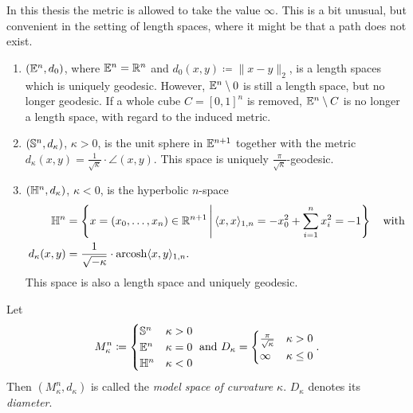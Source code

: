 \begin{rem}
  In this thesis the metric is allowed to take the value \(\infty\). This is a bit unusual, but convenient in the setting of length spaces, where it might be that a path does not exist.
\end{rem}

\begin{bsp}
  \begin{enumerate}
  \item \((\mathbb{E}^n, d_0)\), where \(\mathbb{E}^n = \mathbb{R}^n\) and \(d_0(x,y) \coloneqq \|x - y\|_2\), is a length spaces which is uniquely geodesic. However, \(\mathbb{E}^n \setminus {0}\) is still a length space, but no longer geodesic. If a whole cube \(C= [0,1]^n\) is removed, \(\mathbb{E}^n \setminus C\) is no longer a length space, with regard to the induced metric. 
  \item \((\mathbb{S}^n, d_\kappa)\), \(\kappa > 0\), is the unit sphere in \(\mathbb{E}^{n+1}\) together with the metric \(d_{\kappa}(x,y) = \frac{1}{\sqrt{\kappa}} \cdot \angle (x,y)\). This space is uniquely \(\frac{\pi}{\sqrt{\kappa}}\)-geodesic.
  \item \((\mathbb{H}^n, d_\kappa)\), \(\kappa < 0\), is the hyperbolic \(n\)-space
    \begin{align*}
      \mathbb{H}^n & = \left\{x = (x_0, \dots, x_n)\in \mathbb{R}^{n+1} \,\middle|\, \langle x, x \rangle_{1,n} = -x_0^2 + \sum_{i=1}^n x_i^2 = -1 \right\} \quad \text{with}\\
      d_\kappa(x,y) & = \frac{1}{\sqrt{-\kappa}} \cdot \operatorname{arcosh} \langle x,y \rangle_{1,n}.
    \end{align*}
    This space is also a length space and uniquely geodesic.
  \end{enumerate}
\end{bsp}

\begin{defin}
  Let
  \begin{align*}
    M_\kappa^n \coloneqq
    \begin{cases}
      \mathbb{S}^n & \kappa > 0\\
      \mathbb{E}^n & \kappa = 0\\
      \mathbb{H}^n & \kappa < 0
    \end{cases} \text{ and }
    D_\kappa =
    \begin{cases}
      \frac{\pi}{\sqrt{\kappa}} & \kappa > 0\\
      \infty & \kappa \leq 0
    \end{cases}.
  \end{align*}
  Then \((M_\kappa^n, d_\kappa)\) is called the \emph{model space of curvature \(\kappa\)}. \(D_\kappa\) denotes its \emph{diameter}.
\end{defin}


